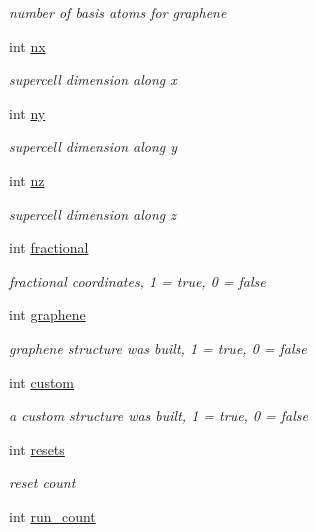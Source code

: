 \begin{DoxyCompactItemize}
\begin{DoxyCompactList}\small\item\em number of basis atoms for graphene \end{DoxyCompactList}\item 
int \hyperlink{class_reader_a85d35ff338db8e5915d7620a730df6fb}{nx}
\begin{DoxyCompactList}\small\item\em supercell dimension along x \end{DoxyCompactList}\item 
int \hyperlink{class_reader_a68ce806c514dd9323b66de3ca25285c2}{ny}
\begin{DoxyCompactList}\small\item\em supercell dimension along y \end{DoxyCompactList}\item 
int \hyperlink{class_reader_ab09026e1e834afa843386f8da4f3e5d3}{nz}
\begin{DoxyCompactList}\small\item\em supercell dimension along z \end{DoxyCompactList}\item 
int \hyperlink{class_reader_a913c9024181fd0fbb2dea5265fa097c1}{fractional}
\begin{DoxyCompactList}\small\item\em fractional coordinates, 1 = true, 0 = false \end{DoxyCompactList}\item 
int \hyperlink{class_reader_aa0c8ca660b7982ecc0fcaa673a1db16b}{graphene}
\begin{DoxyCompactList}\small\item\em graphene structure was built, 1 = true, 0 = false \end{DoxyCompactList}\item 
int \hyperlink{class_reader_aeffa187da9ac5feb5c3e5e078fe43fde}{custom}
\begin{DoxyCompactList}\small\item\em a custom structure was built, 1 = true, 0 = false \end{DoxyCompactList}\item 
int \hyperlink{class_reader_a3a38a2290db448491a46a74ca4413c71}{resets}
\begin{DoxyCompactList}\small\item\em reset count \end{DoxyCompactList}\item 
int \hyperlink{class_reader_a7915928dbe39a87fe9d7ef829f848acb}{run\+\_\+count}

\end{DoxyCompactItemize}

